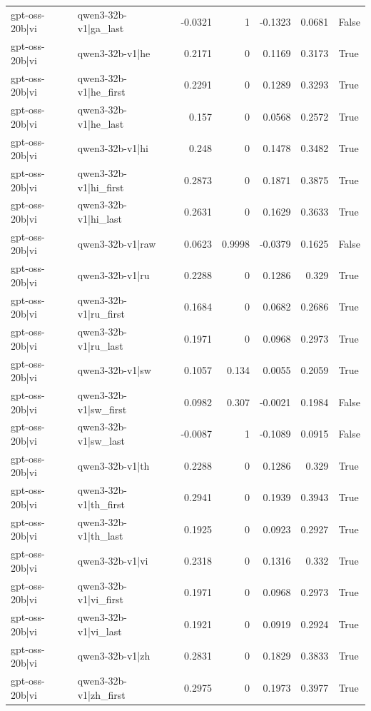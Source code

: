 \begin{table}
\begin{tabular}{l l r r r r l}
gpt-oss-20b|vi & qwen3-32b-v1|ga_last & -0.0321 & 1 & -0.1323 & 0.0681 & False \\
gpt-oss-20b|vi & qwen3-32b-v1|he & 0.2171 & 0 & 0.1169 & 0.3173 & True \\
gpt-oss-20b|vi & qwen3-32b-v1|he_first & 0.2291 & 0 & 0.1289 & 0.3293 & True \\
gpt-oss-20b|vi & qwen3-32b-v1|he_last & 0.157 & 0 & 0.0568 & 0.2572 & True \\
gpt-oss-20b|vi & qwen3-32b-v1|hi & 0.248 & 0 & 0.1478 & 0.3482 & True \\
gpt-oss-20b|vi & qwen3-32b-v1|hi_first & 0.2873 & 0 & 0.1871 & 0.3875 & True \\
gpt-oss-20b|vi & qwen3-32b-v1|hi_last & 0.2631 & 0 & 0.1629 & 0.3633 & True \\
gpt-oss-20b|vi & qwen3-32b-v1|raw & 0.0623 & 0.9998 & -0.0379 & 0.1625 & False \\
gpt-oss-20b|vi & qwen3-32b-v1|ru & 0.2288 & 0 & 0.1286 & 0.329 & True \\
gpt-oss-20b|vi & qwen3-32b-v1|ru_first & 0.1684 & 0 & 0.0682 & 0.2686 & True \\
gpt-oss-20b|vi & qwen3-32b-v1|ru_last & 0.1971 & 0 & 0.0968 & 0.2973 & True \\
gpt-oss-20b|vi & qwen3-32b-v1|sw & 0.1057 & 0.134 & 0.0055 & 0.2059 & True \\
gpt-oss-20b|vi & qwen3-32b-v1|sw_first & 0.0982 & 0.307 & -0.0021 & 0.1984 & False \\
gpt-oss-20b|vi & qwen3-32b-v1|sw_last & -0.0087 & 1 & -0.1089 & 0.0915 & False \\
gpt-oss-20b|vi & qwen3-32b-v1|th & 0.2288 & 0 & 0.1286 & 0.329 & True \\
gpt-oss-20b|vi & qwen3-32b-v1|th_first & 0.2941 & 0 & 0.1939 & 0.3943 & True \\
gpt-oss-20b|vi & qwen3-32b-v1|th_last & 0.1925 & 0 & 0.0923 & 0.2927 & True \\
gpt-oss-20b|vi & qwen3-32b-v1|vi & 0.2318 & 0 & 0.1316 & 0.332 & True \\
gpt-oss-20b|vi & qwen3-32b-v1|vi_first & 0.1971 & 0 & 0.0968 & 0.2973 & True \\
gpt-oss-20b|vi & qwen3-32b-v1|vi_last & 0.1921 & 0 & 0.0919 & 0.2924 & True \\
gpt-oss-20b|vi & qwen3-32b-v1|zh & 0.2831 & 0 & 0.1829 & 0.3833 & True \\
gpt-oss-20b|vi & qwen3-32b-v1|zh_first & 0.2975 & 0 & 0.1973 & 0.3977 & True \\

\end{tabular}
\end{table}
